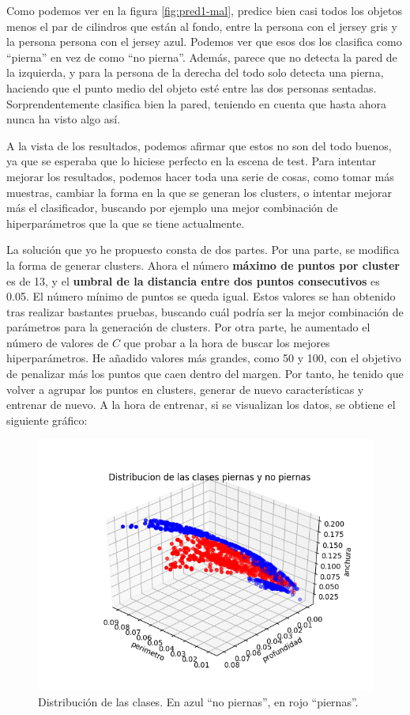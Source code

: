 \documentclass[11pt,a4paper]{article}
\begin{document}
Como podemos ver en la figura \ref{fig:pred1-mal}, predice bien casi todos los
objetos menos el par de cilindros que están al fondo, entre la persona con el
jersey gris y la persona persona con el jersey azul. Podemos ver que esos dos
los clasifica como ``pierna'' en vez de como ``no pierna''. Además, parece que no
detecta la pared de la izquierda, y para la persona de la derecha del
todo solo detecta una pierna, haciendo que el punto medio del objeto esté entre
las dos personas sentadas. Sorprendentemente clasifica bien la pared, teniendo
en cuenta que hasta ahora nunca ha visto algo así.

A la vista de los resultados, podemos afirmar que estos no son del todo buenos,
ya que se esperaba que lo hiciese perfecto en la escena de test. Para intentar
mejorar los resultados, podemos hacer toda una serie de cosas, como tomar
más muestras, cambiar la forma en la que se generan los clusters, o intentar
mejorar más el clasificador, buscando por ejemplo una mejor combinación de hiperparámetros
que la que se tiene actualmente.

La solución que yo he propuesto consta de dos partes. Por una parte, se modifica
la forma de generar clusters. Ahora el número \textbf{máximo de puntos por cluster} es
de 13, y el \textbf{umbral de la distancia entre dos puntos consecutivos} es 0.05.
El número mínimo de puntos se queda igual. Estos valores se han obtenido tras realizar
bastantes pruebas, buscando cuál podría ser la mejor combinación de parámetros para la generación
de clusters. Por otra parte, he aumentado
el número de valores de $C$ que probar a la hora de buscar los mejores hiperparámetros.
He añadido valores más grandes, como 50 y 100, con el objetivo de penalizar más los
puntos que caen dentro del margen. Por tanto, he tenido que volver a agrupar los
puntos en clusters, generar de nuevo características y entrenar de nuevo. A la
hora de entrenar, si se visualizan los datos, se obtiene el siguiente gráfico:

\begin{figure}[H]
\centering
\includegraphics[scale=0.57]{img/plot3d-pocos-puntos}
\caption{Distribución de las clases. En azul ``no piernas'', en rojo ``piernas''.}
\end{figure}
\end{document}
